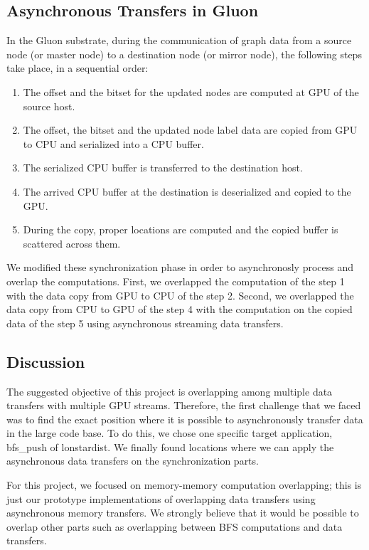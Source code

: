 \subsection{Asynchronous Transfers in Gluon}

In the Gluon substrate, during the communication of graph data from a source node (or master node) to a destination node (or mirror node), the following steps take place, in a sequential order:
\begin{enumerate}
\item The offset and the bitset for the updated nodes are computed at GPU of the source host.
\item The offset, the bitset and the updated node label data are copied from GPU to CPU and serialized into a CPU buffer.
\item The serialized CPU buffer is transferred to the destination host.
\item The arrived CPU buffer at the destination is deserialized and copied to the GPU.
\item During the copy, proper locations are computed and the copied buffer is scattered across them.
\end{enumerate}

We modified these synchronization phase in order to asynchronosly process and overlap the computations.
First, we overlapped the computation of the step 1 with the data copy from GPU to CPU of the step 2.
Second, we overlapped the data copy from CPU to GPU of the step 4 with the computation on the copied data of the step 5
using asynchronous streaming data transfers.

\subsection{Discussion}

The suggested objective of this project is overlapping among multiple data transfers with multiple GPU streams.
Therefore, the first challenge that we faced was to find the exact position where it is possible to asynchronously 
transfer data in the large code base.
To do this, we chose one specific target application, bfs\_push of lonstardist.
We finally found locations where we can apply the asynchronous data transfers on the synchronization parts.


For this project, we focused on memory-memory computation overlapping; this is just our prototype implementations
of overlapping data transfers using asynchronous memory transfers.
We strongly believe that it would be possible to overlap other parts such as
overlapping between BFS computations and data transfers.


